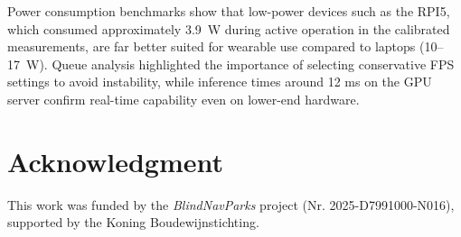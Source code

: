 \documentclass{ieeeaccess}
\begin{document}
Power consumption benchmarks show that low-power devices such as the RPI5, which consumed approximately 3.9~W during active operation in the calibrated measurements, are far better suited for wearable use compared to laptops (10--17~W). Queue analysis highlighted the importance of selecting conservative FPS settings to avoid instability, while inference times around 12 ms on the GPU server confirm real-time capability even on lower-end hardware.  




\section*{Acknowledgment}
This work was funded by the \textit{BlindNavParks} project (Nr. 2025-D7991000-N016), supported by the Koning Boudewijnstichting.

\appendices
\end{document}

